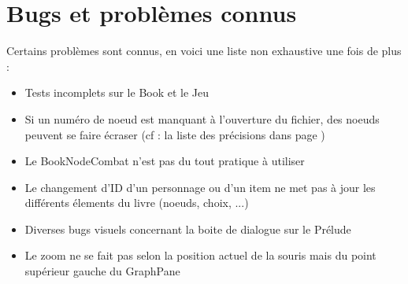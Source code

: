 	\section{Bugs et problèmes connus}

		Certains problèmes sont connus, en voici une liste non exhaustive une fois de plus :

		\begin{itemize}
			\item{Tests incomplets sur le Book et le Jeu}
			\item{Si un numéro de noeud est manquant à l'ouverture du fichier, des noeuds peuvent se faire écraser (cf : la liste des précisions dans  page \pageref{subsec:noeud_delete_missing_index})}
			\item{Le BookNodeCombat n'est pas du tout pratique à utiliser}
			\item{Le changement d'ID d'un personnage ou d'un item ne met pas à jour les différents élements du livre (noeuds, choix, ...)}
			\item{Diverses bugs visuels concernant la boite de dialogue sur le Prélude}
			\item{Le zoom ne se fait pas selon la position actuel de la souris mais du point supérieur gauche du GraphPane}
		\end{itemize}
